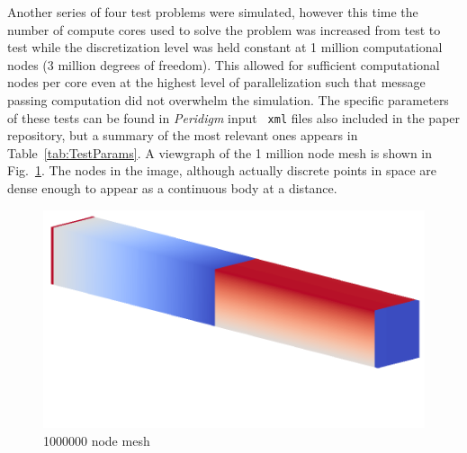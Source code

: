 \documentclass[preprint,12pt]{elsarticle}
\begin{document}
Another series of four test problems were simulated, however this time the
number of compute cores used to solve the problem was increased from test to
test while the discretization level was held constant at 1 million
computational nodes (3 million degrees of freedom). This allowed for sufficient
computational nodes per core even at the highest level of parallelization such
that message passing computation did not overwhelm the simulation.  The
specific parameters of these tests can be found in \emph{Peridigm} input {\tt
xml} files also included in the paper repository, but a summary of the most relevant
ones appears in Table~\ref{tab:TestParams}. A viewgraph of the 1 million node mesh is
shown in Fig.~\ref{fig:MCMesh}. The nodes in the image, although actually discrete points
in space are dense enough to appear as a continuous body at a distance.

\begin{figure}[tbp] \centering \includegraphics[width=1.0\textwidth]{./figs/mesh1000000_replacement.png}
\caption{1000000 node mesh} \label{fig:MCMesh}
\end{figure}
\end{document}
